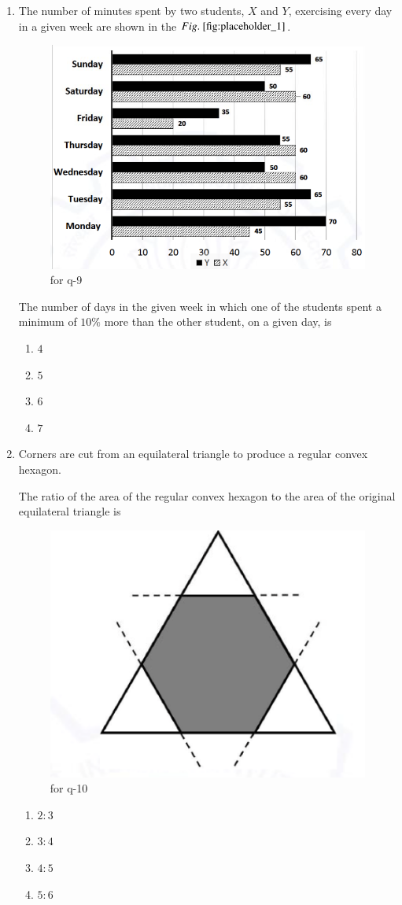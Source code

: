 \documentclass[journal,12pt,onecolumn]{IEEEtran}
\theoremstyle{remark}
\begin{document}
\begin{enumerate}
\item The number of minutes spent by two students, $X$ and $Y$, exercising every day in a given week are shown in the $\figref{fig:placeholder_1}$.  
\begin{figure}[H]
    \centering
    \includegraphics[width=0.4\columnwidth]{figs/2.png}
    \caption{\centering for q-9}
    \label{fig:placeholder_2}
\end{figure}

The number of days in the given week in which one of the students spent a minimum of $10\%$ more than the other student, on a given day, is
\begin{multicols}{4}
\begin{enumerate}
\item $4$
\item $5$
\item $6$
\item $7$
\end{enumerate}
\end{multicols}
\hfill {}

\item Corners are cut from an equilateral triangle to produce a regular convex hexagon.  

The ratio of the area of the regular convex hexagon to the area of the original equilateral triangle is
\begin{figure}[H]
    \centering
    \includegraphics[width=0.4\columnwidth]{figs/3.png}
    \caption{\centering for q-10}
    \label{fig:placeholder_3}
\end{figure}
\begin{multicols}{4}
\begin{enumerate}
\item $2:3$
\item $3:4$
\item $4:5$
\item $5:6$
\end{enumerate}
\end{multicols}
\hfill {}
\end{enumerate}
\end{document}
